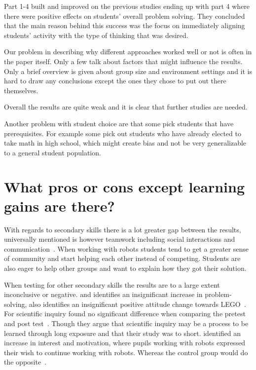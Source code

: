 \bigskip\noindent
Part 1-4 built and improved on the previous studies ending up with part 4 where there were positive effects on students’ overall problem solving. They concluded that the main reason behind this success was the focus on immediately aligning students’ activity with the type of thinking that was desired.

\bigskip\noindent
Our problem in describing why different approaches worked well or not is often in the paper itself. Only a few talk about factors that might influence the results. Only a brief overview is given about group size and environment settings and it is hard to draw any conclusions except the ones they chose to put out there themselves. 

\bigskip\noindent
Overall the results are quite weak and it is clear that further studies are needed.

\bigskip\noindent
Another problem with student choice are that some pick students that have prerequisites. For example some pick out students who have already elected to take math in high school, which might create bias and not be very generalizable to a general student population.

\section{What pros or cons except learning gains are there?}

With regards to secondary skills there is a lot greater gap between the results, 
universally mentioned is however teamwork including social interactions and communication~\cite{mitnik2008autonomous,mitnik2009collaborative,nugent2009use,owens2008lego}.
When working with robots students tend to get a greater sense of community and start helping each other instead of competing. Students are also eager to help other groups and want to explain how they got their solution.

\bigskip\noindent
When testing for other secondary skills the results are to a large extent inconclusive or negative. 
\citeauthor{hussain2006effect} and \citeauthor{lindh2007does} identifies an insignificant increase  in problem-solving, \citeauthor{hussain2006effect} also identifies an insignificant positive attitude change towards LEGO~\cite{hussain2006effect,lindh2007does}. 
For scientific inquiry \citeauthor{williams2007acquisition} found no significant difference when comparing the pretest and post test~\cite{williams2007acquisition}. 
Though they argue that scientific inquiry may be a process to be learned through long exposure and that their study was to short.
 identified an increase in interest and motivation, where pupils working with robots expressed their wish to continue working with robots. Whereas the control group would do the opposite~\cite{nugent2008effect}. 

